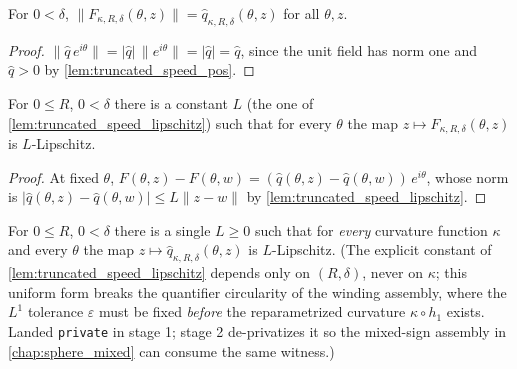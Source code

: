\begin{lemma}
  \label{lem:norm_truncated_field}
  For $0<\delta$,
  $\|F_{\kappa,R,\delta}(\theta,z)\|=\hat q_{\kappa,R,\delta}(\theta,z)$ for all
  $\theta,z$.
\end{lemma}

\begin{proof}

\leanok
  $\|\hat q\,e^{i\theta}\|=|\hat q|\,\|e^{i\theta}\|=|\hat q|=\hat q$, since the unit
  field has norm one and $\hat q>0$ by \cref{lem:truncated_speed_pos}.
\end{proof}

\begin{lemma}
  \label{lem:truncated_field_lipschitz}
  For $0\le R$, $0<\delta$ there is a constant $L$ (the one of
  \cref{lem:truncated_speed_lipschitz}) such that for every $\theta$ the map
  $z\mapsto F_{\kappa,R,\delta}(\theta,z)$ is $L$-Lipschitz.
\end{lemma}

\begin{proof}

\leanok
  At fixed $\theta$,
  $F(\theta,z)-F(\theta,w)=(\hat q(\theta,z)-\hat q(\theta,w))\,e^{i\theta}$, whose norm
  is $|\hat q(\theta,z)-\hat q(\theta,w)|\le L\|z-w\|$ by
  \cref{lem:truncated_speed_lipschitz}.
\end{proof}

\begin{lemma}
  \label{lem:truncated_speed_lipschitz_uniform}
  For $0\le R$, $0<\delta$ there is a single $L\ge0$ such that for \emph{every}
  curvature function $\kappa$ and every $\theta$ the map
  $z\mapsto\hat q_{\kappa,R,\delta}(\theta,z)$ is $L$-Lipschitz. (The explicit
  constant of \cref{lem:truncated_speed_lipschitz} depends only on $(R,\delta)$,
  never on $\kappa$; this uniform form breaks the quantifier circularity of the
  winding assembly, where the $L^1$ tolerance $\varepsilon$ must be fixed
  \emph{before} the reparametrized curvature $\kappa\circ h_1$ exists. Landed
  \texttt{private} in stage 1; stage 2 de-privatizes it so the mixed-sign
  assembly in \cref{chap:sphere_mixed} can consume the same witness.)
\end{lemma}

